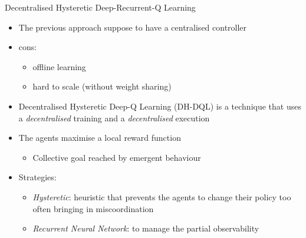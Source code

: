 \documentclass[presentation, 8pt]{beamer}\mode<presentation>{\usetheme{AMSBolognaFC}}
\begin{document}
\begin{frame}{Decentralised Hysteretic Deep-Recurrent-Q Learning}
	\begin{itemize}
		\item The previous approach suppose to have a centralised controller
		\item cons:
		\begin{itemize}
			\item offline learning
			\item hard to scale (without weight sharing)
		\end{itemize}
		\item Decentralised Hysteretic Deep-Q Learning (DH-DQL) is a technique that uses a \emph{decentralised} training and a \emph{decentralised} execution
		\item The agents maximise a local reward function
		\begin{itemize}
			\item Collective goal reached by emergent behaviour
		\end{itemize}
		\item Strategies:
		\begin{itemize}
			\item \emph{Hysteretic}: heuristic that prevents the agents to change their policy too often bringing in miscoordination
			\item \emph{Recurrent Neural Network}: to manage the partial observability
		\end{itemize}
	\end{itemize}
\end{frame}
\end{document}

